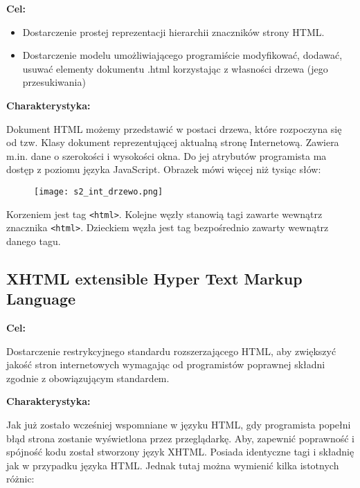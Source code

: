 \textbf{Cel:}
\begin{itemize}
\item Dostarczenie prostej reprezentacji hierarchii znaczników strony HTML.
\item Dostarczenie modelu umożliwiającego programiście modyfikować, dodawać, usuwać elementy dokumentu .html korzystając z własności drzewa (jego przesukiwania)
\end{itemize}

\textbf{Charakterystyka:}

Dokument HTML możemy przedstawić w postaci drzewa, które rozpoczyna się od tzw. Klasy dokument reprezentującej aktualną stronę Internetową. Zawiera m.in. dane o szerokości i wysokości okna. Do jej atrybutów programista ma dostęp z poziomu języka JavaScript. Obrazek mówi więcej niż tysiąc słów:

\begin{figure}[H]
\centering
\texttt{[image: s2\_int\_drzewo.png]}
\end{figure}

Korzeniem jest tag \texttt{<html>}. Kolejne węzły stanowią tagi zawarte wewnątrz znacznika \texttt{<html>}. Dzieckiem węzła jest tag bezpośrednio zawarty wewnątrz danego tagu. 

\subsection{XHTML extensible Hyper Text Markup Language}

\textbf{Cel:}

Dostarczenie restrykcyjnego standardu rozszerzającego HTML, aby zwiększyć jakość stron internetowych wymagając od programistów poprawnej składni zgodnie z obowiązującym standardem.

\textbf{Charakterystyka:}

Jak już zostało wcześniej wspomniane w języku HTML, gdy programista popełni błąd strona zostanie wyświetlona przez przeglądarkę. Aby, zapewnić poprawność i spójność kodu został stworzony język XHTML. Posiada identyczne tagi i składnię jak w przypadku języka HTML. Jednak tutaj można wymienić kilka istotnych różnic:

